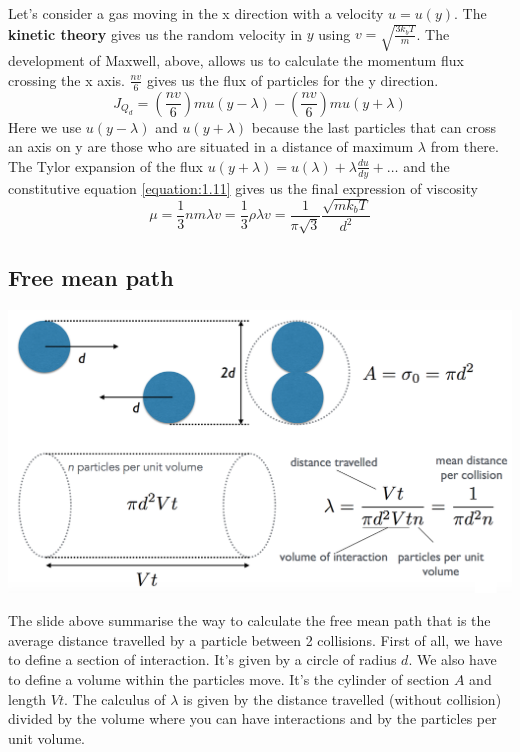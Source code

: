 Let's consider a gas moving in the x direction with a velocity $u=u(y)$. The \textbf{kinetic theory} gives us the random velocity in $y$ using $v = \sqrt{\frac{3k_bT}{m}}$. The development of Maxwell, above, allows us to calculate the momentum flux crossing the x axis. $\frac{nv}{6}$ gives us the flux of particles for the y direction. 
\begin{equation}
	J_{Q_d} = \left(\frac{nv}{6}\right)mu(y-\lambda) - \left(\frac{nv}{6}\right)mu(y+\lambda)
\end{equation}
Here we use $u(y-\lambda)$ and $u(y+\lambda)$ because the last particles that can cross an axis on y are those who are situated in a distance of maximum $\lambda$ from there. \\
The Tylor expansion of the flux $u(y + \lambda) = u(\lambda) + \lambda\frac{du}{dy} + \dots$ and the constitutive equation \eqref{equation:1.11} gives us the final expression of viscosity 
\begin{equation}
	\mu = \frac{1}{3}nm\lambda v = \frac{1}{3}\rho \lambda v = \frac{1}{\pi \sqrt{3}}\frac{\sqrt{mk_bT}}{d^2}
	\label{equation:1.15}
\end{equation}
	
\subsection{Free mean path}
\begin{center}
	\includegraphics[scale=0.45]{ch1/9}
\end{center}
The slide above summarise the way to calculate the free mean path that is the average distance travelled by a particle between 2 collisions. First of all, we have to define a section of interaction. It's given by a circle of radius $d$. We also have to define a volume within the particles move. It's the cylinder of section $A$ and length $Vt$. The calculus of $\lambda$ is given by the distance travelled (without collision) divided by the volume where you can have interactions and by the particles per unit volume. 
	
